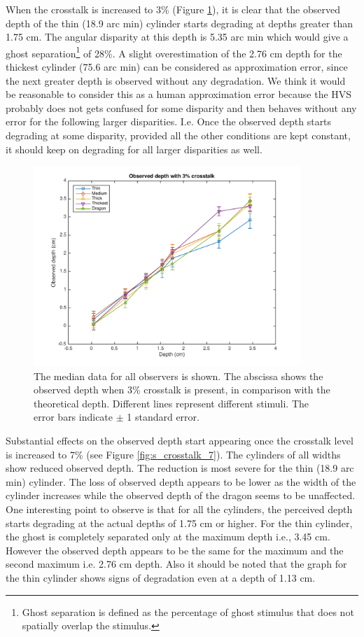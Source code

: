 When the crosstalk is increased to 3\% (Figure \ref{fig:s_crosstalk_3}), it is clear that the observed depth of the thin (18.9 arc min) cylinder starts degrading at depths greater than 1.75 cm. The angular disparity at this depth is 5.35 arc min which would give a ghost separation\footnote{Ghost separation is defined as the percentage of ghost stimulus that does not spatially overlap the stimulus.} of 28\%. A slight overestimation of the 2.76 cm depth for the thickest cylinder (75.6 arc min) can be considered as approximation error, since the next greater depth is observed without any degradation. We think it would be reasonable to consider this as a human approximation error because the HVS probably does not gets confused for some disparity and then behaves without any error for the following larger disparities. I.e. Once the observed depth starts degrading at some disparity, provided all the other conditions are kept constant, it should keep on degrading for all larger disparities as well.
\begin{figure}[H]
\centering
    \includegraphics[width=0.9\textwidth]{./Template_Figures/s_crosstalk_3}
    \caption{The median data for all observers is shown. The abscissa shows the observed depth when 3\% crosstalk is present, in comparison with the theoretical depth. Different lines represent different stimuli. The error bars indicate $\pm$ 1 standard error.\label{fig:s_crosstalk_3}}
\end{figure}

Substantial effects on the observed depth start appearing once the crosstalk level is increased to 7\% (see Figure \ref{fig:s_crosstalk_7}). The cylinders of all widths show reduced observed depth. The reduction is most severe for the thin (18.9 arc min) cylinder. The loss of observed depth appears to be lower as the width of the cylinder increases while the observed depth of the dragon seems to be unaffected. One interesting point to observe is that for all the cylinders, the perceived depth starts degrading at the actual depths of 1.75 cm or higher. For the thin cylinder, the ghost is completely separated only at the maximum depth i.e., 3.45 cm. However the observed depth appears to be the same for the maximum and the second maximum i.e. 2.76 cm depth. Also it should be noted that the graph for the thin cylinder shows signs of degradation even at a depth of 1.13 cm.

